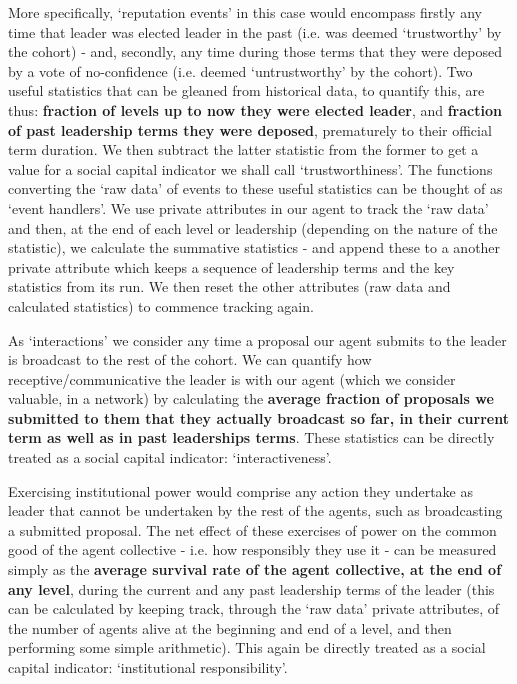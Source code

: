 More specifically, `reputation events' in this case would encompass firstly any time that leader was elected leader in the past (i.e. was deemed `trustworthy' by the cohort) - and, secondly, any time during those terms that they were deposed by a vote of no-confidence (i.e. deemed `untrustworthy' by the cohort). Two useful statistics that can be gleaned from historical data, to quantify this, are thus: \textbf{fraction of levels up to now they were elected leader}, and \textbf{fraction of past leadership terms they were deposed}, prematurely to their official term duration. We then subtract the latter statistic from the former to get a value for a social capital indicator we shall call `trustworthiness'. The functions converting the `raw data' of events to these useful statistics can be thought of as `event handlers'. We use private attributes in our agent to track the `raw data' and then, at the end of each level or leadership (depending on the nature of the statistic), we calculate the summative statistics - and append these to a another private attribute which keeps a sequence of leadership terms and the key statistics from its run. We then reset the other attributes (raw data and calculated statistics) to commence tracking again. 

As `interactions' we consider any time a proposal our agent submits to the leader is broadcast to the rest of the cohort. We can quantify how receptive/communicative the leader is with our agent (which we consider valuable, in a network) by calculating the \textbf{average fraction of proposals we submitted to them that they actually broadcast so far, in their current term as well as in past leaderships terms}. These statistics can be directly treated as a social capital indicator: `interactiveness'. 

Exercising institutional power would comprise any action they undertake as leader that cannot be undertaken by the rest of the agents, such as broadcasting a submitted proposal. The net effect of these exercises of power on the common good of the agent collective - i.e. how responsibly they use it - can be measured simply as the \textbf{average survival rate of the agent collective, at the end of any level}, during the current and any past leadership terms of the leader (this can be calculated by keeping track, through the `raw data' private attributes, of the number of agents alive at the beginning and end of a level, and then performing some simple arithmetic). This again be directly treated as a social capital indicator: `institutional responsibility'. 

